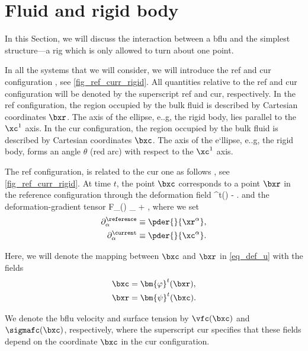\section{Fluid and rigid body}\label{sec_fl_rigid}

In this Section, we will discuss the interaction between a  \ac{bflu} and the simplest structure---a  \ac{rig} which is only allowed to turn about one point.


In all the systems that we will consider, we will introduce the \ac{ref} and \ac{cur} configuration \cite{kamenskyLectureNotesMAE,landauTheoryElasticity1986,slaughterLinearizedTheoryElasticity2002}, see \cref{fig_ref_curr_rigid}. All quantities relative to the \ac{ref} and \ac{cur} configuration will be denoted by the superscript \ac{ref} and \ac{cur}, respectively.
In the \ac{ref} configuration, the region occupied by the bulk fluid is described by Cartesian coordinates $\bxr$. The  axis of the ellipse, e..g, the rigid body, lies parallel to the $\xc^1$ axis.
In the \ac{cur} configuration, the region occupied by the bulk fluid is described by Cartesian coordinates $\bxc$. The  axis of the e`llipse, e..g, the rigid body, forms an angle  $\theta$ (red arc) with respect to the $\xc^1$ axis.


The \ac{ref} configuration, is related to the \ac{cur} one as follows \cite{kamenskyLectureNotesMAE}, see \cref{fig_ref_curr_rigid}. At  time $t$, the point $\bxc$  corresponds to a point $\bxr$ in the reference configuration through the deformation field \cite{landauFluidMechanics1987}
\be\label{eq_def_u}
\budom^t(\bxr) \equiv \bxc - \bxr.
\ee
and the deformation-gradient tensor
\be
\label{eq_def_F}
F_{\alpha \beta}(\bu) \equiv \delta_{\alpha \beta} + ,
\ee
where we set
\begin{align}\label{eq_def_pder_ref}
        \partial^\reference_\alpha & \equiv \pder{}{\xr^\alpha}, \\
        \label{eq_def_pder_cur}
        \partial^\current_\alpha   & \equiv \pder{}{\xc^\alpha}.
\end{align}

Here, we will denote the mapping between $\bxc$ and $\bxr$ in \cref{eq_def_u} with the fields
\begin{align}\label{eq_def_phi}
        \bxc & = \bm{\varphi}^t(\bxr), \\
        \label{eq_def_psi}
        \bxr & = \bm{\psi}^t(\bxc).
\end{align}

We denote the \ac{bflu} velocity and surface tension by $\vfc(\bxc)$ and $\sigmafc(\bxc)$, respectively, where the superscript \ac{cur} specifies that these fields depend on the coordinate $\bxc$ in the \ac{cur} configuration.


